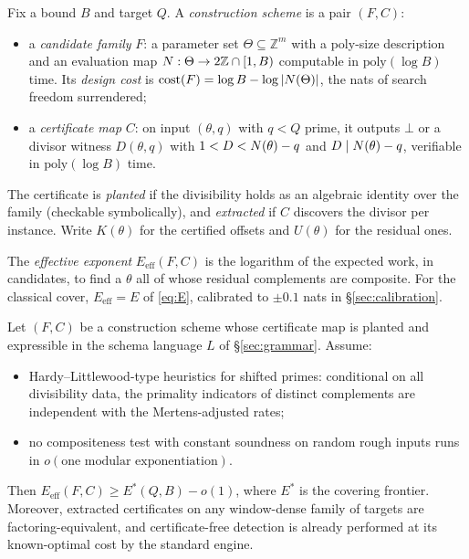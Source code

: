 \begin{definition}\label{def:scheme}
Fix a bound $B$ and target $Q$. A \emph{construction scheme} is a pair
$(F,C)$:
\begin{itemize}
\item a \emph{candidate family} $F$: a parameter set $\Theta\subseteq\mathbb Z^{m}$
with a poly-size description and an evaluation map
$N:\Theta\to2\mathbb Z\cap[1,B)$ computable in $\mathrm{poly}(\log B)$ time. Its
\emph{design cost} is $\mathrm{cost}(F)=\log B-\log|N(\Theta)|$, the nats of
search freedom surrendered;
\item a \emph{certificate map} $C$: on input $(\theta,q)$ with $q<Q$ prime, it
outputs $\bot$ or a divisor witness $D(\theta,q)$ with
$1<D<N(\theta)-q$ and $D\mid N(\theta)-q$, verifiable in $\mathrm{poly}(\log B)$
time.
\end{itemize}
The certificate is \emph{planted} if the divisibility holds as an algebraic
identity over the family (checkable symbolically), and \emph{extracted} if $C$
discovers the divisor per instance. Write $K(\theta)$ for the certified offsets
and $U(\theta)$ for the residual ones.
\end{definition}

The \emph{effective exponent} $E_{\text{eff}}(F,C)$ is the logarithm of the
expected work, in candidates, to find a $\theta$ all of whose residual
complements are composite. For the classical cover, $E_{\text{eff}}=E$ of
\eqref{eq:E}, calibrated to $\pm0.1$ nats in \S\ref{sec:calibration}.

\begin{theorem}\label{thm:closure}
Let $(F,C)$ be a construction scheme whose certificate map is planted and
expressible in the schema language $L$ of \S\ref{sec:grammar}. Assume:
\begin{itemize}
\item[(H1)] Hardy--Littlewood-type heuristics for shifted primes: conditional on
all divisibility data, the primality indicators of distinct complements are
independent with the Mertens-adjusted rates;
\item[(H2)] no compositeness test with constant soundness on random rough inputs
runs in $o(\text{one modular exponentiation})$.
\end{itemize}
Then $E_{\text{eff}}(F,C)\ge E^{*}(Q,B)-o(1)$, where $E^{*}$ is the covering
frontier. Moreover, extracted certificates on any window-dense family of targets
are factoring-equivalent, and certificate-free detection is already performed at
its known-optimal cost by the standard engine.
\end{theorem}

